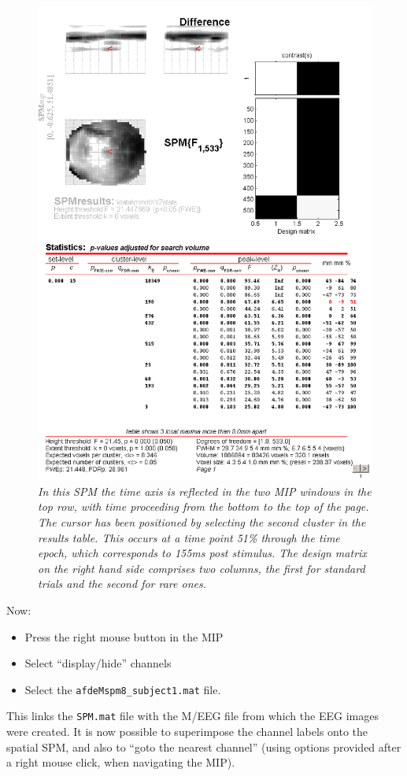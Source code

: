  \begin{figure}
\begin{center}
\includegraphics[width=120mm]{mmn/3DSPM}
\caption{\em In this SPM the time axis is reflected in the two MIP windows in the top row, with time proceeding from the bottom to the top of the page. The cursor has been positioned by selecting the second cluster in the results table. This occurs at a time point 51\% through the time epoch, which corresponds to 155ms post stimulus. The design matrix on the right hand side comprises two columns, the first for standard trials and the second for rare ones. \label{3DSPM}}
\end{center}
\end{figure}
Now:
\begin{itemize}
\item{Press the right mouse button in the MIP}
\item{Select ``display/hide'' channels}
\item{Select the \texttt{afdeMspm8\_subject1.mat} file.}
\end{itemize}
This links the \texttt{SPM.mat} file with the M/EEG file from which the EEG images were created.
It is now possible to superimpose the channel labels onto the spatial SPM, and also to ``goto the nearest channel'' (using options provided after a right mouse click, when navigating the MIP).
 
